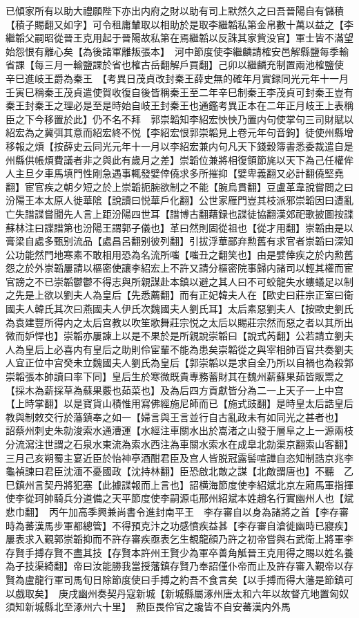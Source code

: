已傾家所有以助大禮願陛下亦出内府之財以助有司上默然久之曰吾晉陽自有儲積【積子賜翻又如字】可令租庸輦取以相助於是取李繼韜私第金帛數十萬以益之【李繼韜父嗣昭從晉王克用起于晉陽故私第在焉繼韜以反誅其家貲没官】軍士皆不滿望始怨恨有離心矣【為後諸軍離叛張本】　河中節度使李繼麟請榷安邑解縣鹽每季輸省課【每三月一輸鹽課於省也榷古岳翻解戶買翻】己卯以繼麟充制置兩池榷鹽使　辛巳進岐王爵為秦王　【考異日茂貞改封秦王薛史無的確年月實録同光元年十一月壬寅巳稱秦王茂貞遣使賀收復自後皆稱秦王至二年辛巳制秦王李茂貞可封秦王豈有秦王封秦王之理必是至是時始自岐王封秦王也通鑑考異正本在二年正月岐王上表稱臣之下今移置於此】仍不名不拜　郭崇韜知李紹宏怏怏乃置内句使掌句三司財賦以紹宏為之冀弭其意而紹宏終不悦【李紹宏恨郭崇韜見上卷元年句音鉤】徒使州縣增移報之煩【按薛史云同光元年十一月以李紹宏兼内句凡天下錢穀簿書悉委裁遣自是州縣供帳煩費議者非之與此有歲月之差】崇韜位兼將相復領節旄以天下為己任權侔人主旦夕車馬填門性剛急遇事輒發嬖倖僥求多所摧抑【嬖卑義翻又必計翻僥堅堯翻】宦官疾之朝夕短之於上崇韜扼腕欲制之不能【腕烏貫翻】豆盧革韋說嘗問之曰汾陽王本太原人徙華隂【說讀曰悦華戶化翻】公世家雁門豈其枝派邪崇韜因曰遭亂亡失譜諜嘗聞先人言上距汾陽四世耳【譜博古翻藉録也諜徒協翻漢郊祀歌披圖按諜蘇林注曰諜譜第也汾陽王謂郭子儀也】革曰然則固從祖也【從才用翻】崇韜由是以膏梁自處多甄别流品【處昌呂翻别彼列翻】引拔浮華鄙弃勲舊有求官者崇韜曰深知公功能然門地寒素不敢相用恐為名流所嗤【嗤丑之翻笑也】由是嬖倖疾之於内勲舊怨之於外崇韜屢請以樞密使讓李紹宏上不許又請分樞密院事歸内諸司以輕其權而宦官謗之不已崇韜鬱鬱不得志與所親謀赴本鎮以避之其人曰不可蛟龍失水螻蟻足以制之先是上欲以劉夫人為皇后【先悉薦翻】而有正妃韓夫人在【歐史曰莊宗正室曰衛國夫人韓氏其次曰燕國夫人伊氏次魏國夫人劉氏耳】太后素惡劉夫人【按歐史劉氏為袁建豐所得内之太后宫教以吹笙歌舞莊宗悦之太后以賜莊宗然而惡之者以其所出微而妒悍也】崇韜亦屢諫上以是不果於是所親說崇韜曰【說式芮翻】公若請立劉夫人為皇后上必喜内有皇后之助則伶宦輩不能為患矣崇韜從之與宰相帥百官共奏劉夫人宜正位中宫癸未立魏國夫人劉氏為皇后【郭崇韜以是求自全乃所以自禍也為殺郭崇韜張本帥讀曰率下同】皇后生於寒微既貴專務蓄財其在魏州薪蘇果茹皆販鬻之【採木為薪採草為蘇果覈也茹菜也】及為后四方貢獻皆分為二一上天子一上中宫【上時掌翻】以是寶貨山積惟用寫佛經施尼師而已【施式豉翻】是時皇太后誥皇后教與制敕交行於藩鎮奉之如一【婦言與王言並行自古亂政未有如同光之甚者也】　詔蔡州刺史朱勍浚索水通漕運【水經注車關水出於嵩渚之山發于層阜之上一源兩枝分流瀉注世謂之石泉水東流為索水西注為車關水索水在成臯北勍渠京翻索山客翻】　三月己亥朔蜀主宴近臣於怡神亭酒酣君臣及宫人皆脱冠露髻喧譁自恣知制誥京兆李龜禎諫曰君臣沈湎不憂國政【沈持林翻】臣恐啟北敵之謀【北敵謂唐也】不聽　乙巳鎮州言契丹將犯塞【此據諜報而上言也】詔横海節度使李紹斌北京左廂馬軍指揮使李從珂帥騎兵分道備之天平節度使李嗣源屯邢州紹斌本姓趙名行實幽州人也【斌悲巾翻】　丙午加高季興兼尚書令進封南平王　李存審自以身為諸將之首【李存審時為蕃漢馬步軍都總管】不得預克汴之功感憤疾益甚【李存審自滄徙幽時已寢疾】屢表求入覲郭崇韜抑而不許存審疾亟表乞生覩龍顔乃許之初帝嘗與右武衛上將軍李存賢手搏存賢不盡其技【存賢本許州王賢少為軍卒善角觝晉王克用得之賜以姓名養為子技渠綺翻】帝曰汝能勝我當授藩鎮存賢乃奉詔僅仆帝而止及許存審入覲帝以存賢為盧龍行軍司馬旬日除節度使曰手搏之約吾不食言矣【以手搏而得大藩是節鎮可以戲取矣】　庚戌幽州奏契丹寇新城【新城縣屬涿州唐太和六年以故督亢地置匈奴須知新城縣北至涿州六十里】　勲臣畏伶官之讒皆不自安蕃漢内外馬